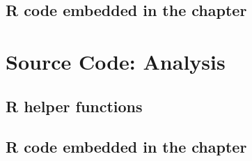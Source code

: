 \documentclass[draftthesis]{neiuthesis}
\begin{document}
\section*{R code embedded in the chapter}


\chapter{Source Code: Analysis}

\section*{R helper functions}


\section*{R code embedded in the chapter}

\end{document}
